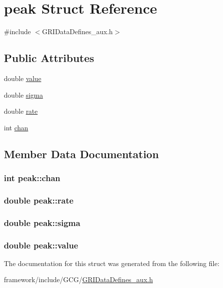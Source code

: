 \hypertarget{structpeak}{\section{peak \-Struct \-Reference}
\label{structpeak}
}


{\ttfamily \#include $<$\-G\-R\-I\-Data\-Defines\-\_\-aux.\-h$>$}

\subsection*{\-Public \-Attributes}
\begin{DoxyCompactItemize}
\item 
double \hyperlink{structpeak_a352500ad4680503d153dc3e796306400}{value}
\item 
double \hyperlink{structpeak_a5a2e094a77b33f5e36722b35ff6df1af}{sigma}
\item 
double \hyperlink{structpeak_a656deaf56d9ecf3d81b3542edd1e6c82}{rate}
\item 
int \hyperlink{structpeak_a14b1a5e6e34e73e75620e037417a3043}{chan}
\end{DoxyCompactItemize}


\subsection{\-Member \-Data \-Documentation}
\hypertarget{structpeak_a14b1a5e6e34e73e75620e037417a3043}{
\subsubsection[{chan}]{\setlength{\rightskip}{0pt plus 5cm}int {\bf peak\-::chan}}}\label{structpeak_a14b1a5e6e34e73e75620e037417a3043}
\hypertarget{structpeak_a656deaf56d9ecf3d81b3542edd1e6c82}{
\subsubsection[{rate}]{\setlength{\rightskip}{0pt plus 5cm}double {\bf peak\-::rate}}}\label{structpeak_a656deaf56d9ecf3d81b3542edd1e6c82}
\hypertarget{structpeak_a5a2e094a77b33f5e36722b35ff6df1af}{
\subsubsection[{sigma}]{\setlength{\rightskip}{0pt plus 5cm}double {\bf peak\-::sigma}}}\label{structpeak_a5a2e094a77b33f5e36722b35ff6df1af}
\hypertarget{structpeak_a352500ad4680503d153dc3e796306400}{
\subsubsection[{value}]{\setlength{\rightskip}{0pt plus 5cm}double {\bf peak\-::value}}}\label{structpeak_a352500ad4680503d153dc3e796306400}


\-The documentation for this struct was generated from the following file\-:\begin{DoxyCompactItemize}
\item 
framework/include/\-G\-C\-G/\hyperlink{GRIDataDefines__aux_8h}{\-G\-R\-I\-Data\-Defines\-\_\-aux.\-h}\end{DoxyCompactItemize}
